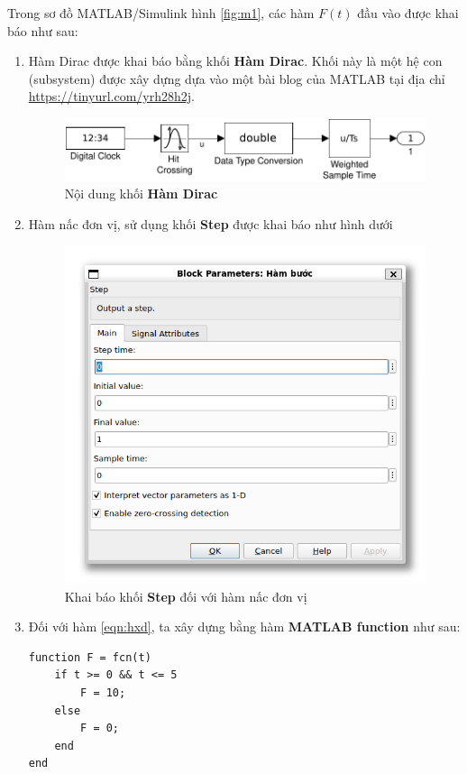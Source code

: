 \documentclass[12pt,a4paper]{article}
\begin{document}
Trong sơ đồ MATLAB/Simulink hình \ref{fig:m1}, các hàm $F(t)$ đầu vào được khai báo như sau:
\begin{enumerate}
    \item Hàm Dirac được khai báo bằng khối \textbf{Hàm Dirac}. Khối này là một hệ con (subsystem) được xây dựng dựa vào một bài blog của MATLAB tại địa chỉ \url{https://tinyurl.com/yrh28h2j}.
    \begin{figure}[ht]
        \centering
        \includegraphics[width=\linewidth]{MATLAB_2.pdf}
        \caption{Nội dung khối \textbf{Hàm Dirac}}
    \end{figure}

    \item Hàm nấc đơn vị, sử dụng khối \textbf{Step} được khai báo như hình dưới
    \vspace{-5mm}
    \begin{figure}[ht]
        \centering
        \includegraphics[width=0.5\linewidth]{MATLAB_3.png}
        \vspace{-5mm}
        \caption{Khai báo khối \textbf{Step} đối với hàm nấc đơn vị}
    \end{figure}

    \item Đối với hàm \eqref{eqn:hxd}, ta xây dựng bằng hàm \textbf{MATLAB function} như sau:
    \begin{lstlisting}[style=matlabstyle,caption=Khai báo hàm \eqref{eqn:hxd}]
function F = fcn(t)
    if t >= 0 && t <= 5
        F = 10;
    else
        F = 0;
    end
end        
    \end{lstlisting}
\end{enumerate}
\end{document}
